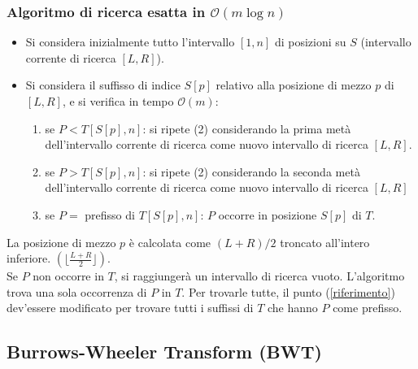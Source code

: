 \subsubsection{Algoritmo di ricerca esatta in  \texorpdfstring{$\mathcal{O} (m \log n)$}{}}
\begin{itemize}
    \item Si considera inizialmente tutto l’intervallo $[1,n]$ di posizioni su $S$ (intervallo corrente di ricerca $[L,R]$).
    \item Si considera il suffisso di indice $S[p]$ relativo alla posizione di mezzo $p$ di $[L,R]$, e si verifica in tempo $\mathcal{O}(m)$:
    \begin{enumerate}
        \item se $P < T[S[p], n]$: si ripete (2) considerando la prima metà dell’intervallo corrente di ricerca come nuovo intervallo di ricerca $[L,R]$.
        \item se $P > T[S[p], n]$: si ripete (2) considerando la seconda metà dell’intervallo corrente di ricerca come nuovo intervallo di ricerca $[L,R]$ 
        \item  \label{riferimento}se $P = $ prefisso di $T[S[p], n]$: $P$ occorre in posizione $S[p]$ di $T$.
    \end{enumerate}
\end{itemize}

La posizione di mezzo $p$ è calcolata come $(L+R)/2$ troncato all’intero inferiore. $\left( \lfloor \frac{L+R}{2} \rfloor \right)$.\\ 
Se $P$ non occorre in $T$, si raggiungerà un intervallo di ricerca vuoto. L’algoritmo trova una sola occorrenza di $P$ in $T$. Per trovarle tutte, il punto (\ref{riferimento}) dev’essere modificato per trovare tutti i suffissi di $T$ che hanno $P$ come prefisso.

\subsection{Burrows-Wheeler Transform (BWT)}


